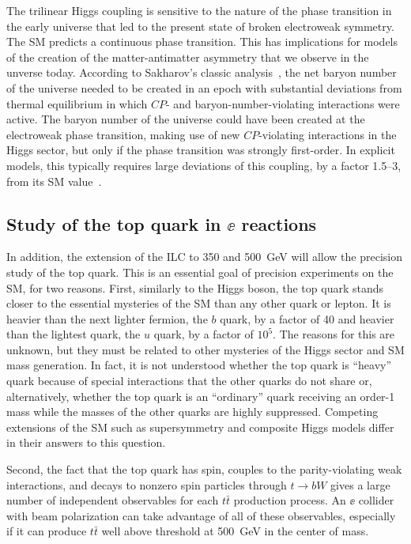 The trilinear Higgs coupling is sensitive to the nature of the phase
transition in the early universe that led to the present state of
broken electroweak symmetry.  
The  SM predicts a continuous phase transition.   This has
implications for models of the creation of the matter-antimatter
asymmetry that we observe in the unverse today. According to
Sakharov's classic analysis~\cite{Sakharov:1967dj}, the net baryon number of the universe
needed to be created in an epoch with substantial deviations from
thermal equilibrium in which $CP$- and baryon-number-violating
interactions were active.    The baryon number of the universe could
have been created at the electroweak phase transition, making use of new
$CP$-violating interactions in the Higgs sector, but only if the phase
transition was strongly first-order.   In explicit models, this
typically requires large deviations of this coupling, by a factor
1.5--3, from its SM value~\cite{Morrissey:2012db}.





\subsection{Study of the top quark in $\ee$ reactions}

In addition, the extension of the ILC to 350 and 500~GeV will allow the precision
study of the top quark.   This is an essential goal of precision
experiments on the SM, for two reasons.  First, similarly to the Higgs
boson, the top quark stands closer to the essential mysteries of the
SM than any other quark or lepton.   It is heavier than the next
lighter fermion, the $b$ quark, by a factor of 40 and heavier than the
lightest quark, the $u$ quark, by a factor of $10^5$.  The reasons for
this are unknown, but they must be related to other mysteries of the
Higgs sector and SM mass generation.  In fact, it is not understood
whether the top quark is ``heavy'' quark because of special
interactions that the other quarks do not share or, alternatively, whether the top
quark is an ``ordinary'' quark receiving an order-1 mass while the
masses of the other quarks are highly suppressed.  Competing extensions of the
SM such as supersymmetry and composite Higgs models differ in their
answers to this question.   

Second, the fact that the top quark has spin, couples to the
parity-violating weak interactions, and decays to nonzero spin
particles through  $t\to bW$ gives a large number of independent
observables for each $t\bar t$ production process. An $\ee$ collider
with beam polarization can take advantage of all of these observables,
especially if it can produce $t\bar t$ well above threshold at
500~GeV in the center of mass.  

